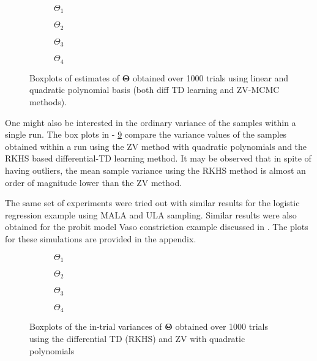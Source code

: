 \begin{figure}[h]
	\centering
	\begin{subfigure}{0.45\textwidth}
		\caption{$\Theta_1$}
		\label{Theta_1}
	\end{subfigure}
	\hfill
	\begin{subfigure}{0.45\textwidth}
		\caption{$\Theta_2$}
		\label{Theta_2}
	\end{subfigure}
	\vfill
	\begin{subfigure}{0.45\textwidth}
		\caption{$\Theta_3$}
		\label{Theta_3}
	\end{subfigure}
	\hfill
	\begin{subfigure}{0.45\textwidth}
		\caption{$\Theta_4$}
		\label{Theta_4}
	\end{subfigure}
	
	\label{box_plots_Theta}
	\caption{Boxplots of estimates of $\boldsymbol{\Theta}$ obtained over 1000 trials using linear and quadratic polynomial basis (both diff TD learning and ZV-MCMC methods).}
\end{figure}

One might also be interested in the ordinary variance of the samples within a single run. The box plots in  - \ref{var_Theta4} compare the variance values of the samples obtained within a run using the ZV method with quadratic polynomials and the RKHS based differential-TD learning method. It may be observed that in spite of having outliers, the mean sample variance using the RKHS method is almost an order of magnitude lower than the ZV method.

The same set of experiments were tried out with similar results for the logistic regression example using MALA and ULA sampling. Similar results were also obtained for the probit model Vaso constriction example discussed in \cite{papmirgir}. The plots for these simulations are provided in the appendix.
\begin{figure}[h]
	\centering
	\begin{subfigure}{0.45\textwidth}
		\caption{$\Theta_1$}
		\label{var_Theta1}
	\end{subfigure}
	\hfill
	\begin{subfigure}{0.45\textwidth}
		\caption{$\Theta_2$}
		\label{var_Theta2}
	\end{subfigure}
	\vfill
	\begin{subfigure}{0.45\textwidth}
		\caption{$\Theta_3$}
		\label{var_Theta3}
	\end{subfigure}
	\hfill
	\begin{subfigure}{0.45\textwidth}
		\caption{$\Theta_4$}
		\label{var_Theta4}
	\end{subfigure}
	\label{box_plots_ varTheta_all}
	\caption{Boxplots of the in-trial variances of $\boldsymbol{\Theta}$ obtained over 1000 trials using the differential TD (RKHS) and ZV with quadratic polynomials}
\end{figure}

